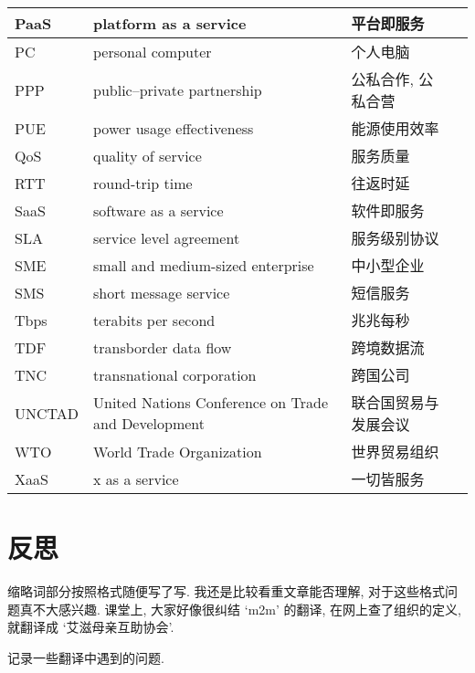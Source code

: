 \documentclass[a4paper, UTF8, 12pt]{article}
\begin{document}
\begin{longtable}{m{2cm}m{3cm}m{3cm}m{4cm}}
    \hline
    PaaS & platform as a service & 平台即服务 & \\
    \hline
    PC & personal computer & 个人电脑 & \\
    \hline
    PPP & public–private partnership & 公私合作, 公私合营 & \\
    \hline
    PUE & power usage effectiveness & 能源使用效率 & \\
    \hline
    QoS & quality of service & 服务质量 & \\
    \hline
    RTT & round-trip time & 往返时延 & \\
    \hline
    SaaS & software as a service & 软件即服务 & \\
    \hline
    SLA & service level agreement & 服务级别协议 & \\ 
    \hline
    SME & small and medium-sized enterprise & 中小型企业 & \\
    \hline
    SMS & short message service & 短信服务 & \\
    \hline
    Tbps & terabits per second & 兆兆每秒 & \\
    \hline
    TDF & transborder data flow & 跨境数据流 & \\ 
    \hline
    TNC & transnational corporation & 跨国公司 & \\
    \hline
    UNCTAD & United Nations Conference on Trade and Development & 联合国贸易与发展会议 & \\
    \hline
    WTO & World Trade Organization & 世界贸易组织 & \\
    \hline
    XaaS & x as a service & 一切皆服务 & \\
    \hline
\end{longtable}

\section{反思}
缩略词部分按照格式随便写了写. 我还是比较看重文章能否理解, 对于这些格式问题真不大感兴趣. 课堂上, 大家好像很纠结 `m2m' 的翻译, 在网上查了组织的定义, 就翻译成 `艾滋母亲互助协会'.

记录一些翻译中遇到的问题.
\end{document}
